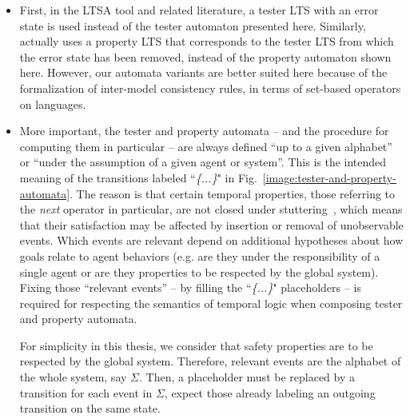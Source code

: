 \begin{itemize}

\item First, in the LTSA tool \cite{Magee:1999} and related literature, a tester LTS with an error state is used instead of the tester automaton presented here. Similarly, \cite{Letier:2005, Letier:2008} actually uses a property LTS that corresponds to the tester LTS from which the error state has been removed, instead of the property automaton shown here. However, our automata variants are better suited here because of the formalization of inter-model consistency rules, in terms of set-based operators on languages. 

\item More important, the tester and property automata -- and the procedure for computing them in particular -- are always defined ``up to a given alphabet'' or ``under the assumption of a given agent or system''. This is the intended meaning of the transitions labeled ``\emph{\{...\}}" in Fig.~\ref{image:tester-and-property-automata}. The reason is that certain temporal properties, those referring to the \emph{next} operator in particular, are not closed under stuttering~\cite{Lamport:1994}, which means that their satisfaction may be affected by insertion or removal of unobservable events. Which events are relevant depend on additional hypotheses about how goals relate to agent behaviors (e.g. are they under the responsibility of a single agent or are they properties to be respected by the global system). Fixing those ``relevant events'' -- by filling the ``\emph{\{...\}}" placeholders -- is required for respecting the semantics of temporal logic when composing tester and property automata. 

For simplicity in this thesis, we consider that safety properties are to be respected by the global system. Therefore, relevant events are the alphabet of the whole system, say $\Sigma$. Then, a placeholder must be replaced by a transition for each event in $\Sigma$, expect those already labeling an outgoing transition on the same state.

\end{itemize}
